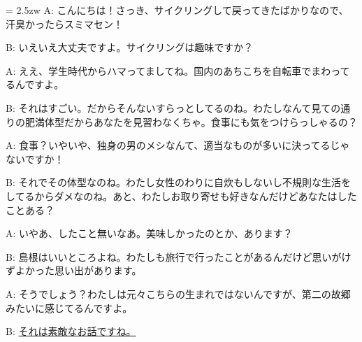 \documentclass[11pt]{amsart}
\title{}
\author{}
\newenvironment{hangall}[1]{\hangindent = 2.5zw\everypar{\hangindent = 2.5zw}}{}
\begin{document}
\maketitle
\begin{hangall}{}%
A: こんにちは！さっき、サイクリングして戻ってきたばかりなので、汗臭かったらスミマセン！

B: いえいえ大丈夫ですよ。サイクリングは趣味ですか？

A: ええ、学生時代からハマってましてね。国内のあちこちを自転車でまわってるんですよ。

B: それはすごい。だからそんないすらっとしてるのね。わたしなんて見ての通りの肥満体型だからあなたを見習わなくちゃ。食事にも気をつけらっしゃるの？

A: 食事？いやいや、独身の男のメシなんて、適当なものが多いに決ってるじゃないですか！

B: それでその体型なのね。わたし女性のわりに自炊もしないし不規則な生活をしてるからダメなのね。あと、わたしお取り寄せも好きなんだけどあなたはしたことある？

A: いやあ、したこと無いなあ。美味しかったのとか、あります？

B: 島根はいいところよね。わたしも旅行で行ったことがあるんだけど思いがけずよかった思い出があります。

A: そうでしょう？わたしは元々こちらの生まれではないんですが、第二の故郷みたいに感じてるんですよ。

B: \ul{それは素敵なお話ですね。}\end{hangall}
\end{document}
